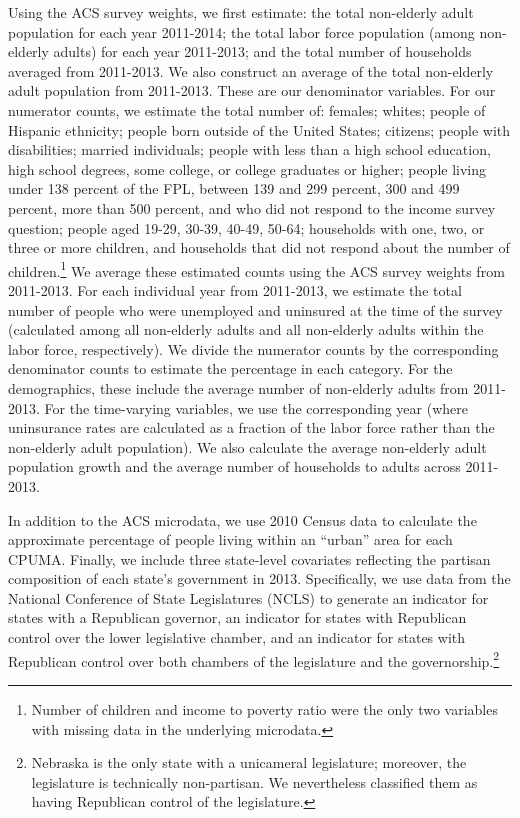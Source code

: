 \documentclass[aoas]{imsart}
\theoremstyle{plain}
\theoremstyle{remark}
\begin{document}
Using the ACS survey weights, we first estimate: the total non-elderly adult population for each year 2011-2014; the total labor force population (among non-elderly adults) for each year 2011-2013; and the total number of households averaged from 2011-2013. We also construct an average of the total non-elderly adult population from 2011-2013. These are our denominator variables. For our numerator counts, we estimate the total number of: females; whites; people of Hispanic ethnicity; people born outside of the United States; citizens; people with disabilities; married individuals; people with less than a high school education, high school degrees, some college, or college graduates or higher; people living under 138 percent of the FPL, between 139 and 299 percent, 300 and 499 percent, more than 500 percent, and who did not respond to the income survey question; people aged 19-29, 30-39, 40-49, 50-64; households with one, two, or three or more children, and households that did not respond about the number of children.\footnote{Number of children and income to poverty ratio were the only two variables with missing data in the underlying microdata.} We average these estimated counts using the ACS survey weights from 2011-2013. For each individual year from 2011-2013, we estimate the total number of people who were unemployed and uninsured at the time of the survey (calculated among all non-elderly adults and all non-elderly adults within the labor force, respectively). We divide the numerator counts by the corresponding denominator counts to estimate the percentage in each category. For the demographics, these include the average number of non-elderly adults from 2011-2013. For the time-varying variables, we use the corresponding year (where uninsurance rates are calculated as a fraction of the labor force rather than the non-elderly adult population). We also calculate the average non-elderly adult population growth and the average number of households to adults across 2011-2013. 

In addition to the ACS microdata, we use 2010 Census data to calculate the approximate percentage of people living within an ``urban'' area for each CPUMA. Finally, we include three state-level covariates reflecting the partisan composition of each state's government in 2013. Specifically, we use data from the National Conference of State Legislatures (NCLS) to generate an indicator for states with a Republican governor, an indicator for states with Republican control over the lower legislative chamber, and an indicator for states with Republican control over both chambers of the legislature and the governorship.\footnote{Nebraska is the only state with a unicameral legislature; moreover, the legislature is technically non-partisan. We nevertheless classified them as having Republican control of the legislature.} 
\end{document}
